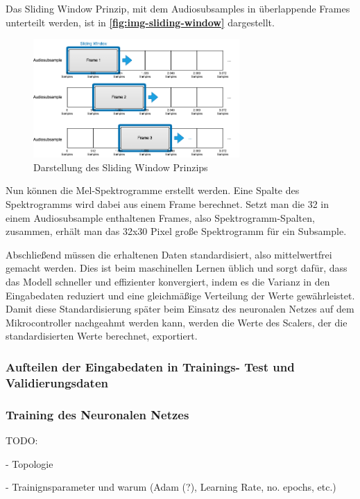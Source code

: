Das Sliding Window Prinzip, mit dem Audiosubsamples in überlappende Frames unterteilt werden, ist in \textbf{\autoref{fig:img-sliding-window}} dargestellt.

\begin{figure}[h!]
\centering
\includegraphics[width=0.7\textwidth]{images/08_durchfuehrung/sliding_window.png}
\caption{Darstellung des Sliding Window Prinzips}
\label{fig:img-sliding-window}
\end{figure}

Nun können die Mel-Spektrogramme erstellt werden. Eine Spalte des Spektrogramms wird dabei aus einem Frame berechnet. Setzt man die 32 in einem Audiosubsample enthaltenen Frames, also Spektrogramm-Spalten, zusammen, erhält man das 32x30 Pixel große Spektrogramm für ein Subsample.

Abschließend müssen die erhaltenen Daten standardisiert, also mittelwertfrei gemacht werden. Dies ist beim maschinellen Lernen üblich und sorgt dafür, dass das Modell schneller und effizienter konvergiert, indem es die Varianz in den Eingabedaten reduziert und eine gleichmäßige Verteilung der Werte gewährleistet. Damit diese Standardisierung später beim Einsatz des neuronalen Netzes auf dem Mikrocontroller nachgeahmt werden kann, werden die Werte des Scalers, der die standardisierten Werte berechnet, exportiert.


\subsubsection{Aufteilen der Eingabedaten in Trainings- Test und Validierungsdaten}

\subsubsection{Training des Neuronalen Netzes}

TODO:

- Topologie

- Trainignsparameter und warum (Adam (?), Learning Rate, no. epochs, etc.)

